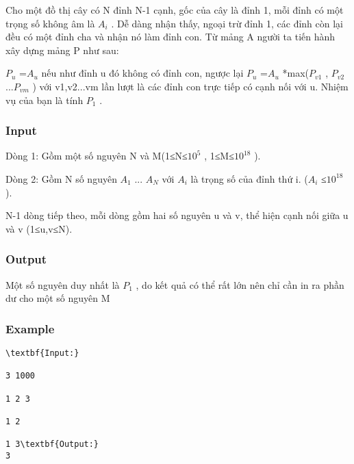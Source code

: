 



   Cho một đồ thị cây có N đỉnh N-1 cạnh, gốc của cây là đỉnh 1, mỗi đỉnh có một trọng số không âm là $A_{i}$   . Dễ dàng nhận thấy, ngoại trừ đỉnh 1, các đỉnh còn lại đều có một đỉnh cha và nhận nó làm đỉnh con. Từ mảng A người ta tiến hành xây dựng mảng P như sau:  

   $P_{u}$   =$A_{u}$   nếu như đỉnh u đó không có đỉnh con, ngược lại $P_{u}$   =$A_{u}$   *max($P_{v1}$   , $P_{v2}$   ...$P_{vm}$   ) với v1,v2...vm lần lượt là các đỉnh con trực tiếp có cạnh nối với u. Nhiệm vụ của bạn là tính $P_{1}$   .  

\subsubsection{   Input  }

   Dòng 1: Gồm một số nguyên N và M(1≤N≤$10^{5}$   , 1≤M≤$10^{18}$   ).  

   Dòng 2: Gồm N số nguyên $A_{1}$   ... $A_{N}$   với $A_{i}$   là trọng số của đỉnh thứ i. ($A_{i}$   ≤$10^{18}$   ).  

   N-1 dòng tiếp theo, mỗi dòng gồm hai số nguyên u và v, thể hiện cạnh nối giữa u và v (1≤u,v≤N).  

\subsubsection{   Output  }

   Một số nguyên duy nhất là $P_{1}$   , do kết quả có thể rất lớn nên chỉ cần in ra phần dư cho một số nguyên M  

\subsubsection{   Example  }
\begin{verbatim}
\textbf{Input:}

3 1000

1 2 3

1 2

1 3\textbf{Output:}
3\end{verbatim}
